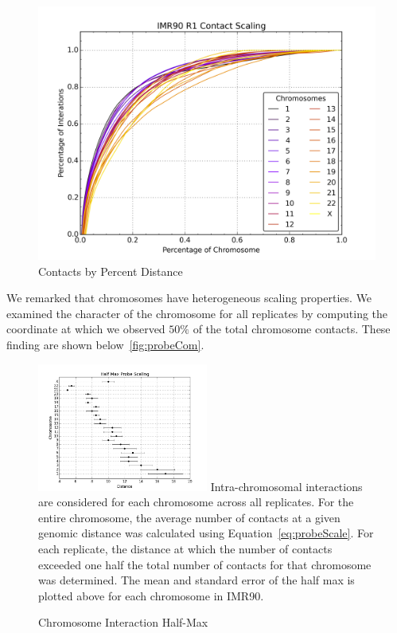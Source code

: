 \begin{figure}[thp]
  \begin{minipage}{0.45\textwidth}
    \centering
    \caption{Contacts by Percent Distance}\label{fig:probeScalesPercent}
    \includegraphics[width=\textwidth]{./figures/results/probeScalesPercent.png}
  \end{minipage}
\end{figure}

We remarked that chromosomes have heterogeneous scaling properties.  We examined the character of the chromosome for all replicates
by computing the coordinate at which we observed $50\%$ of the total chromosome contacts.  These finding are shown below~\ref{fig:probeCom}.

\begin{figure}[thp]
  \centering
  \caption{Chromosome Interaction Half-Max}
  \includegraphics[width=0.5\textwidth]{./figures/results/com.png}
  \medskip
  \small
  Intra-chromosomal interactions are considered for each chromosome across all replicates.  For the entire chromosome, the average number of
  contacts at a given genomic distance was calculated using Equation~\ref{eq:probeScale}.  For each replicate, the distance at which the number
  of contacts exceeded one half the total number of contacts for that chromosome was determined.  The mean and standard error of the half max
  is plotted above for each chromosome in IMR90.
\end{figure}

